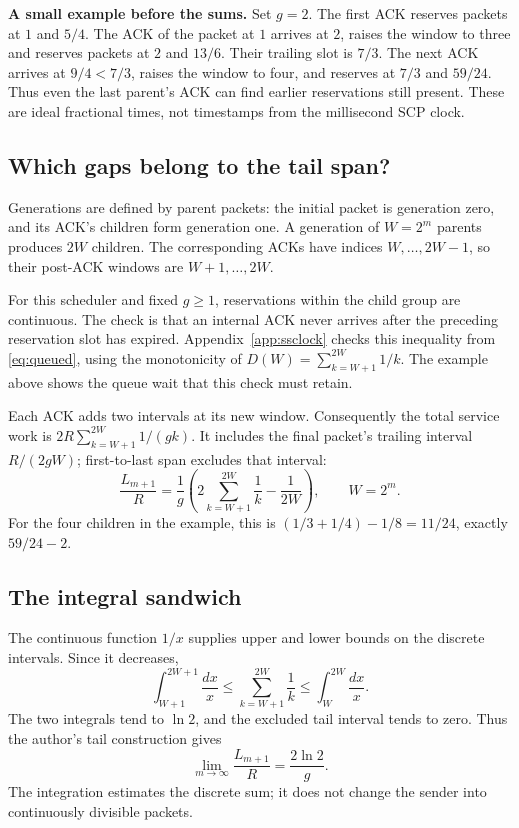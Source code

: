 \documentclass[sigconf,nonacm]{acmart}
\begin{document}
\textbf{A small example before the sums.} Set $g=2$. The first ACK reserves
packets at $1$ and $5/4$. The ACK of the packet at $1$ arrives at $2$,
raises the window to three and reserves packets at $2$ and $13/6$.
Their trailing slot is $7/3$. The next ACK arrives at $9/4<7/3$, raises
the window to four, and reserves at $7/3$ and $59/24$. Thus even the last
parent's ACK can find earlier reservations still present. These are ideal
fractional times, not timestamps from the millisecond SCP clock.

\subsection{Which gaps belong to the tail span?}
Generations are defined by parent packets: the initial packet is generation
zero, and its ACK's children form generation one. A generation of $W=2^m$
parents produces $2W$ children. The corresponding ACKs have indices
$W,\ldots,2W-1$, so their post-ACK windows are $W+1,\ldots,2W$.

For this scheduler and fixed $g\ge1$, reservations within the child group
are continuous. The check is that an internal ACK never arrives after the
preceding reservation slot has expired. Appendix~\ref{app:ssclock} checks
this inequality from \eqref{eq:queued}, using the monotonicity of
$D(W)=\sum_{k=W+1}^{2W}1/k$. The example above shows the queue wait that this
check must retain.

Each ACK adds two intervals at its new window. Consequently the total
service work is $2R\sum_{k=W+1}^{2W}1/(gk)$. It includes the final packet's
trailing interval $R/(2gW)$; first-to-last span excludes that interval:
\begin{equation}
 \frac{L_{m+1}}R=\frac1g\left(2\sum_{k=W+1}^{2W}\frac1k-\frac1{2W}\right),
 \qquad W=2^m.
 \label{eq:span}
\end{equation}
For the four children in the example, this is
$(1/3+1/4)-1/8=11/24$, exactly $59/24-2$.

\subsection{The integral sandwich}
The continuous function $1/x$ supplies upper and lower bounds on the
discrete intervals. Since it decreases,
\begin{equation}
 \int_{W+1}^{2W+1}\frac{dx}{x}
 \le\sum_{k=W+1}^{2W}\frac1k
 \le\int_W^{2W}\frac{dx}{x}.
 \label{eq:sssandwich}
\end{equation}
The two integrals tend to $\ln2$, and the excluded tail interval tends to
zero. Thus the author's tail construction gives
\begin{equation}
 \boxed{\displaystyle\lim_{m\to\infty}\frac{L_{m+1}}R=\frac{2\ln2}{g}}.
\end{equation}
The integration estimates the discrete sum; it does not change the sender
into continuously divisible packets.
\end{document}
